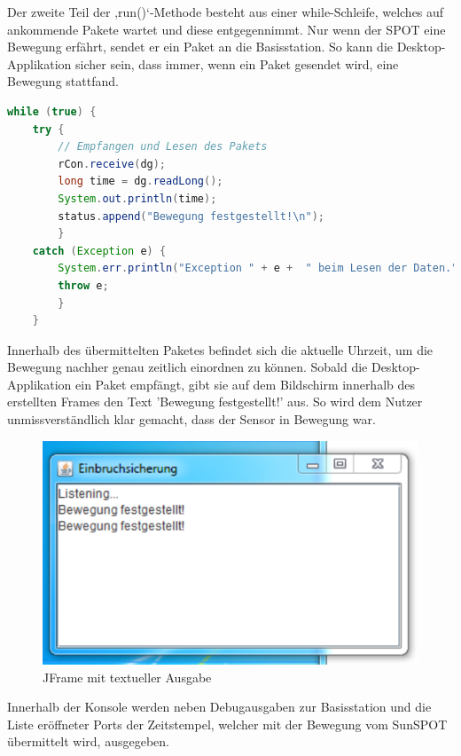 Der zweite Teil der ‚run()‘-Methode besteht aus einer while-Schleife, welches auf ankommende Pakete wartet und diese entgegennimmt. Nur wenn der SPOT eine Bewegung erfährt, sendet er ein Paket an die Basisstation. So kann die Desktop-Applikation sicher sein, dass immer, wenn ein Paket gesendet wird, eine Bewegung stattfand.\\

\begin{lstlisting}[language=Java,caption={Auswerten des empfangenen Paketes},label=lst:rcvpackage,frame=single] 
while (true) {
	try {
		// Empfangen und Lesen des Pakets
		rCon.receive(dg);
		long time = dg.readLong();
		System.out.println(time);
		status.append("Bewegung festgestellt!\n");
		} 
	catch (Exception e) {
		System.err.println("Exception " + e +  " beim Lesen der Daten.");
		throw e;
		}
	}
\end{lstlisting}

Innerhalb des übermittelten Paketes befindet sich die aktuelle Uhrzeit, um die Bewegung nachher genau zeitlich einordnen zu können. Sobald die Desktop-Applikation ein Paket empfängt, gibt sie auf dem Bildschirm innerhalb des erstellten Frames den Text 'Bewegung festgestellt!' aus. So wird dem Nutzer unmissverständlich klar gemacht, dass der Sensor in Bewegung war.

\begin{figure}[H] 
	\centering
	\includegraphics[scale=1.0]{Bilder/bewegung}
	\caption{JFrame mit textueller Ausgabe}
	\label{f:bewegung}
\end{figure}

Innerhalb der Konsole werden neben Debugausgaben zur Basisstation und die Liste eröffneter Ports der Zeitstempel, welcher mit der Bewegung vom SunSPOT übermittelt wird, ausgegeben.

